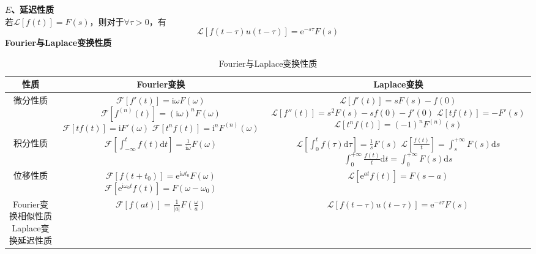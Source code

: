 \documentclass[12pt, a4paper, twoside]{ctexbook}
\begin{document}
\textbf{$E$、延迟性质}\\
若$\mathscr{L}\left[f\left(t\right)\right]=F\left(s\right)$，则对于$\forall\tau>0$，有
$$
\mathscr{L}\left[f\left(t-\tau\right)u\left(t-\tau\right)\right]=\mathrm{e}^{-s\tau}F\left(s\right)
$$
\newpage
\textbf{Fourier与Laplace变换性质}
\begin{table}[h]
    \centering
    \caption{Fourier与Laplace变换性质}\label{Fourier与Laplace变换性质}
    \begin{tabular}{ccc}
    \hline
    性质 & Fourier变换 & Laplace变换 \\
    \hline
    微分性质 & \makecell[c]{$\mathscr{F}\left[ f'\left( t \right) \right] =\text{i}\omega F\left( \omega \right) $ \\
    $\mathscr{F}\left[ f^{\left( n \right)}\left( t \right) \right] =\left( \text{i}\omega \right) ^nF\left( \omega \right) $\\
    $\mathscr{F}\left[ tf\left( t \right) \right] = \text{i}F'\left( \omega \right)$\\
    $\mathscr{F}\left[ t^nf\left( t \right) \right] = \text{i}^nF^{\left( n \right)}\left( \omega \right)$} & 
    \makecell[c]{$\mathscr{L}\left[f'\left(t\right)\right]=sF\left(s\right)-f\left(0\right)$\\$\mathscr{L}\left[f''\left(t\right)\right]=s^2F\left(s\right)-sf\left(0\right)-f'\left(0\right)$\\$\mathscr{L}\left[tf\left(t\right)\right]=-F'\left(s\right)$ \\ 
    $\mathscr{L}\left[t^n f\left(t\right)\right]=\left(-1\right)^n F^{\left(n\right)}\left(s\right)$} \\
    \hline
    积分性质 & $\mathscr{F}\left[ \int_{-\infty}^t{f\left( t \right) \text{d}t} \right] =\frac{1}{\text{i}\omega}F\left( \omega \right)$ & \makecell[c]{$\mathscr{L}\left[ \int_{0}^t{f\left( \tau \right) \text{d}\tau} \right] =\frac{1}{s}F\left( s \right)$\\$\mathscr{L}\left[\frac{f\left(t\right)}{t}\right]=\int_{s}^{+\infty}{F\left(s\right)\mathrm{d}s}$\\$\int_{0}^{+\infty}{\frac{f\left(t\right)}{t}\mathrm{d}t}=\int_{0}^{+\infty}{F\left(s\right)\mathrm{d}s}$} \\
    \hline
    位移性质 & \makecell[c]{$\mathscr{F}\left[ f\left( t + t_0 \right) \right] =\text{e}^{\text{i}\omega t_0}F\left( \omega \right)$\\$\mathscr{F}\left[ \text{e}^{\text{i}\omega_0 t}f\left( t \right) \right] =F\left( \omega -\omega _0 \right)$} & $
    \mathscr{L}\left[\mathrm{e}^{at}f\left(t\right)\right]=F\left(s-a\right)
    $  \\
    \hline
    \makecell[c]{Fourier变换相似性质\\Laplace变换延迟性质} & $\mathscr{F}\left[ f\left( at \right) \right] =\frac{1}{\left| a \right|}F\left( \frac{\omega}{a} \right) $ & $\mathscr{L}\left[f\left(t-\tau\right)u\left(t-\tau\right)\right]=\mathrm{e}^{-s\tau}F\left(s\right)$ \\
    \hline
    \end{tabular}
\end{table}
~\\
\end{document}
